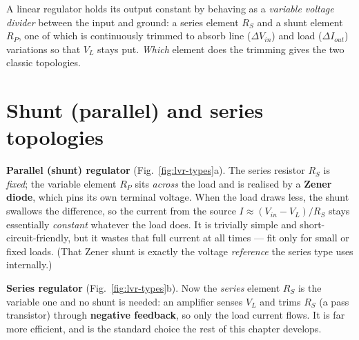 \documentclass[11pt,a4paper,oneside]{book}
\begin{document}
A linear regulator holds its output constant by behaving as a \emph{variable voltage
divider} between the input and ground: a series element $R_S$ and a shunt element
$R_P$, one of which is continuously trimmed to absorb line ($\Delta V_{in}$) and load
($\Delta I_{out}$) variations so that $V_L$ stays put. \emph{Which} element does the
trimming gives the two classic topologies.

\section{Shunt (parallel) and series topologies}
\textbf{Parallel (shunt) regulator} (Fig.~\ref{fig:lvr-types}a). The series resistor
$R_S$ is \emph{fixed}; the variable element $R_P$ sits \emph{across} the load and is
realised by a \textbf{Zener diode}, which pins its own terminal voltage. When the load
draws less, the shunt swallows the difference, so the current from the source
$I\approx(V_{in}-V_L)/R_S$ stays essentially \emph{constant} whatever the load does. It
is trivially simple and short-circuit-friendly, but it wastes that full current at all
times --- fit only for small or fixed loads. (That Zener shunt is exactly the voltage
\emph{reference} the series type uses internally.)

\textbf{Series regulator} (Fig.~\ref{fig:lvr-types}b). Now the \emph{series} element
$R_S$ is the variable one and no shunt is needed: an amplifier senses $V_L$ and trims
$R_S$ (a pass transistor) through \textbf{negative feedback}, so only the load current
flows. It is far more efficient, and is the standard choice the rest of this chapter
develops.
\end{document}
